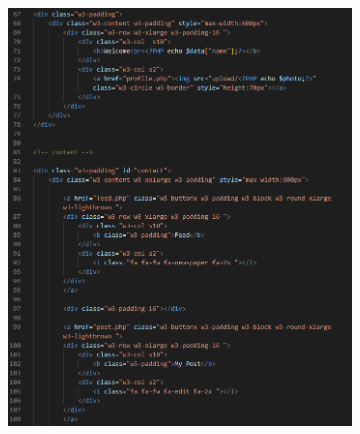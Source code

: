 \begin{enumerate}[1.]
\begin{figure}[h]
\begin{subfigure}[b]{0.6\textwidth}
            \includegraphics[width=\textwidth]{mainmatter/images/frontend/code/musicmain.png}
            \label{fig:sub1}
        \end{subfigure}
        \hspace{0.04\textwidth}
        \begin{subfigure}[b]{0.6\textwidth}
            \centering

\end{subfigure}
\end{figure}
\end{enumerate}
